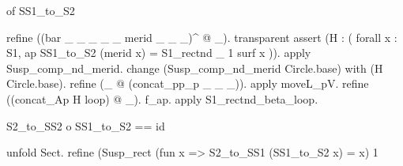 \begin{coqdoccode}
\begin{coqdoccomment}
\begin{coqdoccomment}
of\coqdocindent{0.50em}
SS1\_to\_S2\coqdocindent{0.50em}
\end{coqdoccomment}
\coqdoceol
\coqdocindent{1.00em}
refine\coqdocindent{0.50em}
((bar\coqdocindent{0.50em}
\_\coqdocindent{0.50em}
\_\coqdocindent{0.50em}
\_\coqdocindent{0.50em}
\_\coqdocindent{0.50em}
\_\coqdocindent{0.50em}
merid\coqdocindent{0.50em}
\_\coqdocindent{0.50em}
\_\coqdocindent{0.50em}
\_)\^{}\coqdocindent{0.50em}
@\coqdocindent{0.50em}
\_).\coqdoceol
\coqdocindent{1.00em}
transparent\coqdocindent{0.50em}
assert\coqdocindent{0.50em}
(H\coqdocindent{0.50em}
:\coqdocindent{0.50em}
(\coqdoceol
\coqdocindent{2.00em}
forall\coqdocindent{0.50em}
x\coqdocindent{0.50em}
:\coqdocindent{0.50em}
S1,\coqdocindent{0.50em}
ap\coqdocindent{0.50em}
SS1\_to\_S2\coqdocindent{0.50em}
(merid\coqdocindent{0.50em}
x)\coqdocindent{0.50em}
=\coqdocindent{0.50em}
S1\_rectnd\coqdocindent{0.50em}
\_\coqdocindent{0.50em}
1\coqdocindent{0.50em}
surf\coqdocindent{0.50em}
x\coqdocindent{12.00em}
\coqdoceol
\coqdocindent{1.00em}
)).\coqdoceol
\coqdocindent{1.00em}
apply\coqdocindent{0.50em}
Susp\_comp\_nd\_merid.\coqdoceol
\coqdocindent{1.00em}
change\coqdocindent{0.50em}
(Susp\_comp\_nd\_merid\coqdocindent{0.50em}
Circle.base)\coqdocindent{0.50em}
with\coqdocindent{0.50em}
(H\coqdocindent{0.50em}
Circle.base).\coqdoceol
\coqdocindent{1.00em}
refine\coqdocindent{0.50em}
(\_\coqdocindent{0.50em}
@\coqdocindent{0.50em}
(concat\_pp\_p\coqdocindent{0.50em}
\_\coqdocindent{0.50em}
\_\coqdocindent{0.50em}
\_)).\coqdocindent{0.50em}
apply\coqdocindent{0.50em}
moveL\_pV.\coqdoceol
\coqdocindent{1.00em}
refine\coqdocindent{0.50em}
((concat\_Ap\coqdocindent{0.50em}
H\coqdocindent{0.50em}
loop)\coqdocindent{0.50em}
@\coqdocindent{0.50em}
\_).\coqdocindent{0.50em}
f\_ap.\coqdoceol
\coqdocindent{1.00em}
apply\coqdocindent{0.50em}
S1\_rectnd\_beta\_loop.\coqdoceol
\coqdocindent{1.00em}
\coqdoceol
\coqdoceol
\coqdocindent{1.00em}
\begin{coqdoccomment}
\coqdocindent{0.50em}
S2\_to\_SS2\coqdocindent{0.50em}
o\coqdocindent{0.50em}
SS1\_to\_S2\coqdocindent{0.50em}
==\coqdocindent{0.50em}
id\coqdocindent{0.50em}
\end{coqdoccomment}
\coqdoceol
\coqdocindent{1.00em}
unfold\coqdocindent{0.50em}
Sect.\coqdoceol
\coqdocindent{1.00em}
refine\coqdocindent{0.50em}
(Susp\_rect\coqdocindent{0.50em}
(fun\coqdocindent{0.50em}
x\coqdocindent{0.50em}
=>\coqdocindent{0.50em}
S2\_to\_SS1\coqdocindent{0.50em}
(SS1\_to\_S2\coqdocindent{0.50em}
x)\coqdocindent{0.50em}
=\coqdocindent{0.50em}
x)\coqdocindent{0.50em}
1\coqdocindent{0.50em}

\end{coqdoccomment}
\end{coqdoccode}

